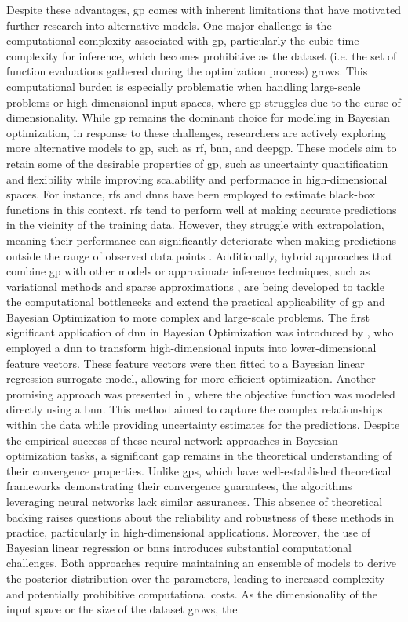 Despite these advantages, \ac{gp} comes with inherent limitations that have motivated further research into alternative models. One major challenge is the computational complexity associated with \ac{gp}, particularly the cubic time complexity for inference, which becomes prohibitive as the dataset (i.e. the set of function evaluations gathered during the optimization process) grows. This computational burden is especially problematic when handling large-scale problems or high-dimensional input spaces, where \ac{gp} struggles due to the curse of dimensionality. 
While \ac{gp} remains the dominant choice for modeling in Bayesian optimization, in response to these challenges,  researchers are actively exploring more alternative models to \ac{gp}, such as \ac{rf}, \ac{bnn}, and \ac{deepgp}. These models aim to retain some of the desirable properties of \ac{gp}, such as uncertainty quantification and flexibility while improving scalability and performance in high-dimensional spaces. For instance, \acfp{rf} and \acfp{dnn} have been employed to estimate black-box functions in this context. \acp{rf} tend to perform well at making accurate predictions in the vicinity of the training data. However, they struggle with extrapolation, meaning their performance can significantly deteriorate when making predictions outside the range of observed data points \citep{shahriari2015taking}. Additionally, hybrid approaches that combine \ac{gp} with other models or approximate inference techniques, such as variational methods \citep{tran2016variational} and sparse approximations \citep{snelson2007local}, are being developed to tackle the computational bottlenecks and extend the practical applicability of \ac{gp} and Bayesian Optimization to more complex and large-scale problems.  The first significant application of \ac{dnn} in Bayesian Optimization was introduced by \citet{snoek2015scalable}, who employed a \ac{dnn} to transform high-dimensional inputs into lower-dimensional feature vectors. These feature vectors were then fitted to a Bayesian linear regression surrogate model, allowing for more efficient optimization. Another promising approach was presented in \citet{springenberg2016bayesian}, where the objective function was modeled directly using a \acf{bnn}. This method aimed to capture the complex relationships within the data while providing uncertainty estimates for the predictions. Despite the empirical success of these neural network approaches in Bayesian optimization tasks, a significant gap remains in the theoretical understanding of their convergence properties. Unlike \acp{gp}, which have well-established theoretical frameworks demonstrating their convergence guarantees, the algorithms leveraging neural networks lack similar assurances. This absence of theoretical backing raises questions about the reliability and robustness of these methods in practice, particularly in high-dimensional applications. Moreover, the use of Bayesian linear regression or \acp{bnn} introduces substantial computational challenges. Both approaches require maintaining an ensemble of models to derive the posterior distribution over the parameters, leading to increased complexity and potentially prohibitive computational costs. As the dimensionality of the input space or the size of the dataset grows, the 